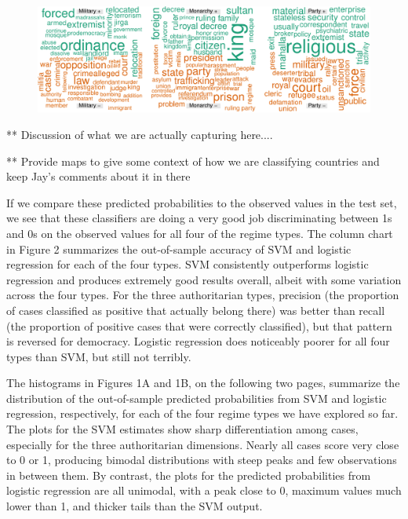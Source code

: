 \documentclass[pdftex,12pt,fullpage,oneside]{amsart}
\begin{document}
\begin{figure}[ht]
	\centering
	\includegraphics[width=1\textwidth]{bin_wrdCloud}
\end{figure}
\FloatBarrier

** Discussion of what we are actually capturing here....

** Provide maps to give some context of how we are classifying countries and keep Jay's comments about it in there

If we compare these predicted probabilities to the observed values in the test set, we see that these classifiers are doing a very good job discriminating between 1s and 0s on the observed values for all four of the regime types. The column chart in Figure 2 summarizes the out-of-sample accuracy of SVM and logistic regression for each of the four types. SVM consistently outperforms logistic regression and produces extremely good results overall, albeit with some variation across the four types. For the three authoritarian types, precision (the proportion of cases classified as positive that actually belong there) was better than recall (the proportion of positive cases that were correctly classified), but that pattern is reversed for democracy. Logistic regression does noticeably poorer for all four types than SVM, but still not terribly.

The histograms in Figures 1A and 1B, on the following two pages, summarize the distribution of the out-of-sample predicted probabilities from SVM and logistic regression, respectively, for each of the four regime types we have explored so far.  The plots for the SVM estimates show sharp differentiation among cases, especially for the three authoritarian dimensions. Nearly all cases score very close to 0 or 1, producing bimodal distributions with steep peaks and few observations in between them. By contrast, the plots for the predicted probabilities from logistic regression are all unimodal, with a peak close to 0, maximum values much lower than 1, and thicker tails than the SVM output. 

\end{document}
